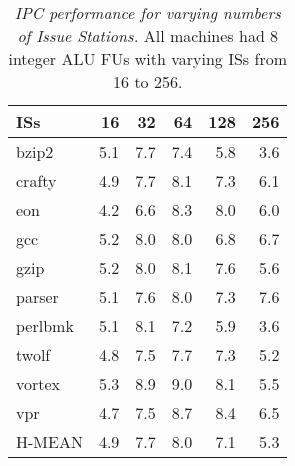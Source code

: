 %
\begin{table}[p]
\begin{center}
\caption{{\em IPC performance for varying numbers of
Issue Stations.}
All machines had 8 integer ALU FUs with varying ISs from 16 to 256.}
\label{tab:iwsize8ipc}
\vspace{+0.1in}
\begin{tabular}{|l||r|r|r|r|r|}
\hline 
{ISs}& 16 & 32 & 64 & 128 & 256 \\
\hline

\hline
bzip2&
5.1 & 7.7 & 7.4 & 5.8 & 3.6 \\

\hline
crafty&
4.9 & 7.7 & 8.1 & 7.3 & 6.1 \\

\hline
eon&
4.2 & 6.6 & 8.3 & 8.0 & 6.0 \\

\hline
gcc&
5.2 & 8.0 & 8.0 & 6.8 & 6.7 \\

\hline
gzip&
5.2 & 8.0 & 8.1 & 7.6 & 5.6 \\

\hline
parser&
5.1 & 7.6 & 8.0 & 7.3 & 7.6 \\

\hline
perlbmk&
5.1 & 8.1 & 7.2 & 5.9 & 3.6 \\

\hline
twolf&
4.8 & 7.5 & 7.7 & 7.3 & 5.2 \\

\hline
vortex&
5.3 & 8.9 & 9.0 & 8.1 & 5.5 \\

\hline
vpr&
4.7 & 7.5 & 8.7 & 8.4 & 6.5 \\

\hline
H-MEAN&
4.9 & 7.7 & 8.0 & 7.1 & 5.3 \\

\hline
\end{tabular}
\end{center}
\end{table}
%
%
